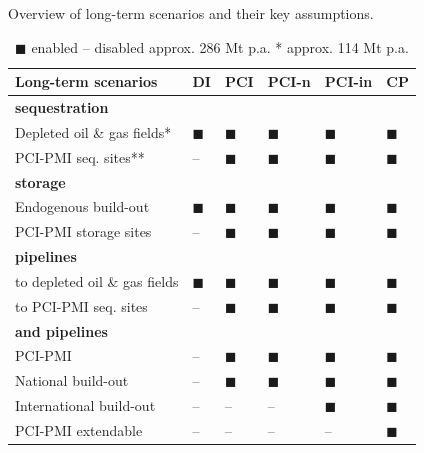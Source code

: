 \documentclass[preprint,12pt,sort&compress]{elsarticle}
\begin{document}
\begin{table}[htpb]
  \centering
  \caption{Overview of long-term scenarios and their key assumptions.}
  \label{tab:long-term_scenarios}
  \scriptsize
  \begin{tabularx}{\linewidth}{R{2.6cm}>{\centering\arraybackslash}X>{\centering\arraybackslash}X>{\centering\arraybackslash}X>{\centering\arraybackslash}X>{\centering\arraybackslash}X}
    \toprule
    \textbf{Long-term scenarios} & 
    \textbf{DI} & 
    \textbf{PCI} & 
    \textbf{PCI-n} & 
    \textbf{PCI-in} & 
    \textbf{CP} \\
    \midrule
    \textbf{ sequestration} & & & & & \\
    Depleted oil \& gas fields* & $\blacksquare$ & $\blacksquare$ & $\blacksquare$ & $\blacksquare$ & $\blacksquare$ \\
    PCI-PMI seq. sites** & -- & $\blacksquare$ & $\blacksquare$ & $\blacksquare$ & $\blacksquare$ \\
    \midrule
    \textbf{ storage} & & & & & \\
    Endogenous build-out & $\blacksquare$ & $\blacksquare$ & $\blacksquare$ & $\blacksquare$ & $\blacksquare$ \\
    PCI-PMI storage sites & -- & $\blacksquare$ & $\blacksquare$ & $\blacksquare$ & $\blacksquare$ \\
    \midrule
    \textbf{ pipelines} & & & & & \\
    to depleted oil \& gas fields & $\blacksquare$ & $\blacksquare$ & $\blacksquare$ & $\blacksquare$ & $\blacksquare$ \\
    to PCI-PMI seq. sites & -- & $\blacksquare$ & $\blacksquare$ & $\blacksquare$ & $\blacksquare$ \\
    \midrule
    \textbf{ and  pipelines} & & & & & \\
    PCI-PMI & -- & $\blacksquare$ & $\blacksquare$ & $\blacksquare$ & $\blacksquare$ \\
    National build-out & -- & $\blacksquare$ & $\blacksquare$ & $\blacksquare$ & $\blacksquare$ \\
    International build-out & -- & -- & -- & $\blacksquare$ & $\blacksquare$ \\
    PCI-PMI extendable & -- & -- & -- & -- & $\blacksquare$ \\

    \bottomrule
  \end{tabularx}
  \caption*{\scriptsize $\blacksquare$ enabled \quad -- disabled \quad * approx. 286 Mt p.a. \quad ** approx. 114 Mt p.a.}
\end{table}
\end{document}
